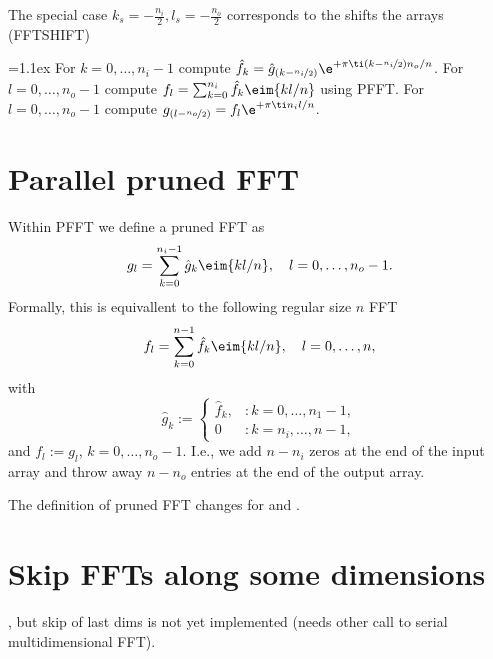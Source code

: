 The special case $k_s=-\frac{n_i}{2}, l_s=-\frac{n_o}{2}$ corresponds to the shifts the arrays (\textsf{FFTSHIFT})
\begin{algorithm}
  \begin{algorithmic}[1]
    \itemsep=1.1ex
    \State For $k=0,\hdots,n_i-1$ compute $\hat f_k = \hat g_{(k-\nicefrac{n_i}{2})} \e^{+\pi\ti (k-\nicefrac{n_i}{2})n_o/n}$.
    \State For $l=0,\hdots,n_o-1$ compute $f_l = \sum_{k=0}^{n_i} \hat f_k \eim{kl/n}$ using PFFT.
    \State For $l=0,\hdots,n_o-1$ compute $g_{(l-\nicefrac{n_o}{2})} = f_l \e^{+\pi\ti n_i l/n}$.
  \end{algorithmic}
\end{algorithm}




\section{Parallel pruned FFT}
Within PFFT we define a pruned FFT as
\begin{equation*}
  g_l = \sum_{k=0}^{n_i-1} \hat g_{k} \eim{kl/n}, \quad l=0,\hdots,n_o-1.
\end{equation*}
Formally, this is equivallent to the following regular size $n$ FFT
\begin{equation*}
  f_l = \sum_{k=0}^{n-1} \hat f_{k} \eim{kl/n}, \quad l=0,\hdots,n,
\end{equation*}
with 
\begin{equation*}
  \hat g_k := 
  \begin{cases}
  \hat f_k, &: k=0,\hdots,n_1-1, \\
  0         &: k=n_i,\hdots,n-1,    
  \end{cases}
\end{equation*}
and $f_l := g_l$, $k=0,\hdots,n_o-1$. I.e., we add $n-n_i$ zeros at the end of the input array and throw away $n-n_o$ entries at the end of the output array.


The definition of pruned FFT changes for  and .


\section{Skip FFTs along some dimensions}

, but skip of last  dims is not yet implemented (needs other call to serial multidimensional FFT). 


